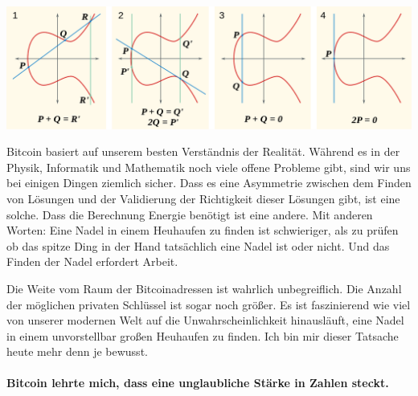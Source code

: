 \begin{center}
  \includegraphics[width=\textwidth]{assets/images/elliptic-curve-examples.png}
  \label{fig:elliptic-curve-examples}
\end{center}

Bitcoin basiert auf unserem besten Verständnis der Realität. Während es in der
Physik, Informatik und Mathematik noch viele offene Probleme gibt, sind wir uns
bei einigen Dingen ziemlich sicher. Dass es eine Asymmetrie zwischen dem Finden
von Lösungen und der Validierung der Richtigkeit dieser Lösungen gibt, ist eine
solche. Dass die Berechnung Energie benötigt ist eine andere. Mit anderen
Worten: Eine Nadel in einem Heuhaufen zu finden ist schwieriger, als zu prüfen
ob das spitze Ding in der Hand tatsächlich eine Nadel ist oder nicht. Und das
Finden der Nadel erfordert Arbeit.

Die Weite vom Raum der Bitcoinadressen ist wahrlich unbegreiflich. Die Anzahl
der möglichen privaten Schlüssel ist sogar noch größer. Es ist faszinierend wie
viel von unserer modernen Welt auf die Unwahrscheinlichkeit hinausläuft, eine
Nadel in einem unvorstellbar großen Heuhaufen zu finden. Ich bin mir dieser
Tatsache heute mehr denn je bewusst.

\paragraph{Bitcoin lehrte mich, dass eine unglaubliche Stärke in Zahlen steckt.}


